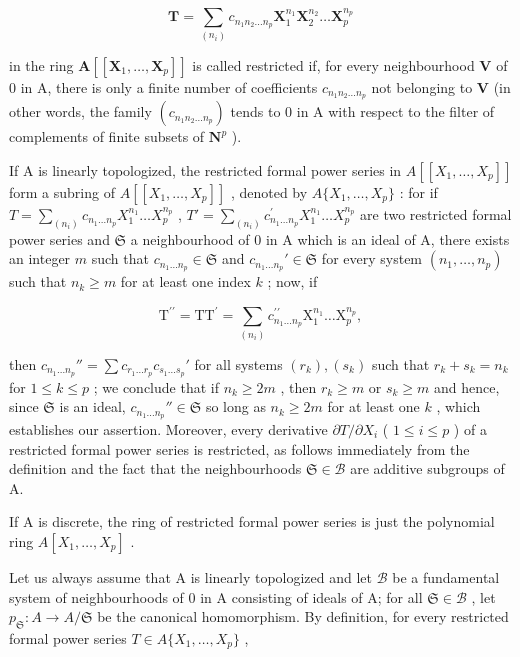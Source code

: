 \[
\mathbf {T} = \sum_ {(n _ {i})} c _ {n _ {1} n _ {2} \dots n _ {p}} \mathbf {X} _ {1} ^ {n _ {1}} \mathbf {X} _ {2} ^ {n _ {2}} \dots \mathbf {X} _ {p} ^ {n _ {p}}
\]

in the ring \(\mathbf{A}[[\mathbf{X}_1,\ldots ,\mathbf{X}_p]]\) is called restricted if, for every neighbourhood \(\mathbf{V}\) of 0 in A, there is only a finite number of coefficients \(c_{n_1n_2\dots n_p}\) not belonging to \(\mathbf{V}\) (in other words, the family \((c_{n_1n_2\dots n_p})\) tends to 0 in A with respect to the filter of complements of finite subsets of \(\mathbf{N}^p\) ).

If A is linearly topologized, the restricted formal power series in \(A[[X_{1},\ldots,X_{p}]]\) form a subring of \(A[[X_{1},\ldots,X_{p}]]\) , denoted by \(A\{X_{1},\ldots,X_{p}\}\) : for if \(T=\sum_{(n_{i})}c_{n_{1}\ldots n_{p}}X_{1}^{n_{1}}\ldots X_{p}^{n_{p}}\) , \(T'=\sum_{(n_{i})}c_{n_{1}\ldots n_{p}}^{'}X_{1}^{n_{1}}\ldots X_{p}^{n_{p}}\) are two restricted formal power series and \(\mathfrak{S}\) a neighbourhood of 0 in A which is an ideal of A, there exists an integer \(m\) such that \(c_{n_1\ldots n_p} \in \mathfrak{S}\) and \(c_{n_1\ldots n_p}' \in \mathfrak{S}\) for every system \((n_1, \ldots, n_p)\) such that \(n_k \geqslant m\) for at least one index \(k\) ; now, if

\[
\mathrm{T} ^ {\prime \prime} = \mathrm{TT} ^ {\prime} = \sum_ {(n _ {i})} c _ {n _ {1} \dots n _ {p}} ^ {\prime \prime} \mathrm{X} _ {1} ^ {n _ {1}} \dots \mathrm{X} _ {p} ^ {n _ {p}},
\]

then \(c_{n_1 \ldots n_p}'' = \sum c_{r_1 \ldots r_p} c_{s_1 \ldots s_p}'\) for all systems \((r_k), (s_k)\) such that \(r_k + s_k = n_k\) for \(1 \leqslant k \leqslant p\) ; we conclude that if \(n_k \geqslant 2m\) , then \(r_k \geqslant m\) or \(s_k \geqslant m\) and hence, since \(\mathfrak{S}\) is an ideal, \(c_{n_1 \ldots n_p}'' \in \mathfrak{S}\) so long as \(n_k \geqslant 2m\) for at least one \(k\) , which establishes our assertion. Moreover, every derivative \(\partial T / \partial X_i\) ( \(1 \leqslant i \leqslant p\) ) of a restricted formal power series is restricted, as follows immediately from the definition and the fact that the neighbourhoods \(\mathfrak{S} \in \mathcal{B}\) are additive subgroups of A.

If A is discrete, the ring of restricted formal power series is just the polynomial ring \(A[X_{1},\ldots,X_{p}]\) .

Let us always assume that A is linearly topologized and let \(\mathcal{B}\) be a fundamental system of neighbourhoods of 0 in A consisting of ideals of A; for all \(\mathfrak{S} \in \mathcal{B}\) , let \(p_{\mathfrak{S}}: A \to A/\mathfrak{S}\) be the canonical homomorphism. By definition, for every restricted formal power series \(T \in A\{X_{1}, \ldots, X_{p}\}\) ,


